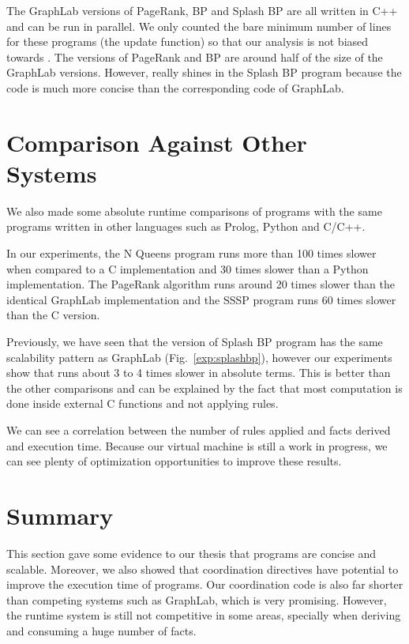 The GraphLab versions of PageRank, BP and Splash BP are all written in C++ and can be run in
parallel. We only counted the bare minimum number of lines for these programs (the update function)
so that our analysis is not biased towards \lang. The \lang versions of PageRank and BP are around
half of the size of the GraphLab versions. However, \lang really shines in the Splash BP program because
the code is much more concise than the corresponding code of GraphLab.

\section{Comparison Against Other Systems}

We also made some absolute runtime comparisons of \lang programs with the same programs written in
other languages such as Prolog, Python and C/C++.

In our experiments, the N Queens program runs
more than 100 times slower when compared to a C implementation and 30 times slower than a Python
implementation. The PageRank algorithm runs around 20 times slower than the identical GraphLab
implementation and the SSSP program runs 60 times slower than the C version.

Previously, we have seen that the \lang version of Splash BP program has the same scalability pattern
as GraphLab (Fig.~\ref{exp:splashbp}), however our experiments show that \lang runs about 3 to 4 times slower in absolute terms. This is better than the other comparisons and can be explained by the fact
that most computation is done inside external C functions and not applying rules.

We can see a correlation between the number of rules applied and facts derived and execution time.
Because our virtual machine is still a work in progress, we can see plenty of optimization opportunities
to improve these results.

\section{Summary}

This section gave some evidence to our thesis that \lang programs are concise and scalable. Moreover, we
also showed that coordination directives have potential to improve the execution time
of programs. Our coordination code is also far shorter than competing systems such as GraphLab, which is
very promising. However, the \lang runtime system is still not competitive in some areas, specially
when deriving and consuming a huge number of facts.
